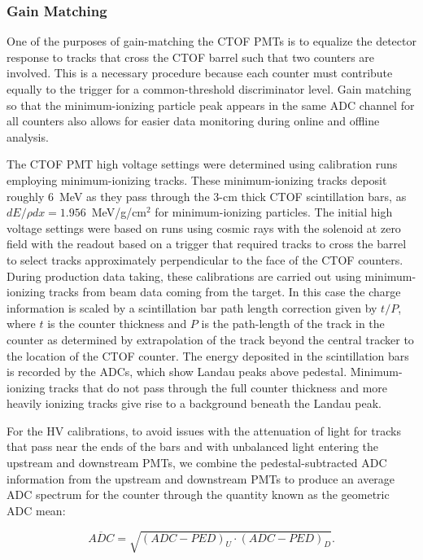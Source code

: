 \documentclass{elsart}
\begin{document}
\subsubsection{Gain Matching}
\label{gain-matching}

One of the purposes of gain-matching the CTOF PMTs is to equalize the detector response to tracks that
cross the CTOF barrel such that two counters are involved. This is a necessary procedure because each
counter must contribute equally to the trigger for a common-threshold discriminator level. Gain matching
so that the minimum-ionizing particle peak appears in the same ADC channel for all counters also allows for
easier data monitoring during online and offline analysis.

The CTOF PMT high voltage settings were determined using calibration runs employing minimum-ionizing
tracks. These minimum-ionizing tracks deposit roughly 6~MeV as they pass through the 3-cm thick CTOF
scintillation bars, as $dE/\rho dx = 1.956$~MeV/g/cm$^2$ for minimum-ionizing particles. The initial high
voltage settings were based on runs using cosmic rays with the solenoid at zero field with the readout
based on a trigger that required tracks to cross the barrel to select tracks approximately perpendicular to
the face of the CTOF counters. During production data taking, these calibrations are carried out using
minimum-ionizing tracks from beam data coming from the target. In this case the charge information is
scaled by a scintillation bar path length correction given by $t/P$, where $t$ is the counter thickness and
$P$ is the path-length of the track in the counter as determined by extrapolation of the track beyond the
central tracker to the location of the CTOF counter. The energy deposited in the scintillation bars is
recorded by the ADCs, which show Landau peaks above pedestal. Minimum-ionizing tracks that do not pass
through the full counter thickness and more heavily ionizing tracks give rise to a background beneath the
Landau peak.

For the HV calibrations, to avoid issues with the attenuation of light for tracks that pass near the ends of
the bars and with unbalanced light entering the upstream and downstream PMTs, we combine the
pedestal-subtracted ADC information from the upstream and downstream PMTs to produce an average
ADC spectrum for the counter through the quantity known as the geometric ADC mean:

\begin{equation}
\label{adc}
\overline{ADC} = \sqrt{ (ADC - PED)_U \cdot (ADC - PED)_D}.
\end{equation}
\end{document}
